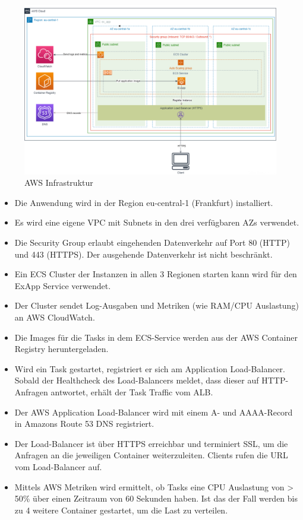 \begin{figure}[htb]
  \centering
  \includegraphics[width=1.0\textwidth]{images/aws_infrastruktur.png}
  \caption[AWS Infrastruktur]{AWS Infrastruktur}
  \label{fig:aws_infrastructure}
\end{figure}

\begin{itemize}
  \item Die Anwendung wird in der Region eu-central-1 (Frankfurt) installiert.
  \item Es wird eine eigene VPC mit Subnets in den drei verfügbaren AZs verwendet.
  \item Die Security Group erlaubt eingehenden Datenverkehr auf Port 80 (HTTP) und 443 (HTTPS).
  Der ausgehende Datenverkehr ist nicht beschränkt.
  \item Ein ECS Cluster der Instanzen in allen 3 Regionen starten kann wird für den ExApp Service verwendet.
  \item Der Cluster sendet Log-Ausgaben und Metriken (wie RAM/CPU Auslastung) an AWS CloudWatch.
  \item Die Images für die Tasks in dem ECS-Service werden aus der AWS Container Registry heruntergeladen.
  \item Wird ein Task gestartet, registriert er sich am Application Load-Balancer.
  Sobald der Healthcheck des Load-Balancers meldet, dass dieser auf HTTP-Anfragen antwortet, erhält der Task Traffic vom ALB.
  \item Der AWS Application Load-Balancer wird mit einem A- und AAAA-Record in Amazons Route 53 DNS registriert.
  \item Der Load-Balancer ist über HTTPS erreichbar und terminiert SSL, um die Anfragen an die jeweiligen Container weiterzuleiten.
  Clients rufen die URL vom Load-Balancer auf.
  \item Mittels AWS Metriken wird ermittelt, ob Tasks eine CPU Auslastung von > 50\% über einen Zeitraum von 60 Sekunden haben.
  Ist das der Fall werden bis zu 4 weitere Container gestartet, um die Last zu verteilen.
\end{itemize}

